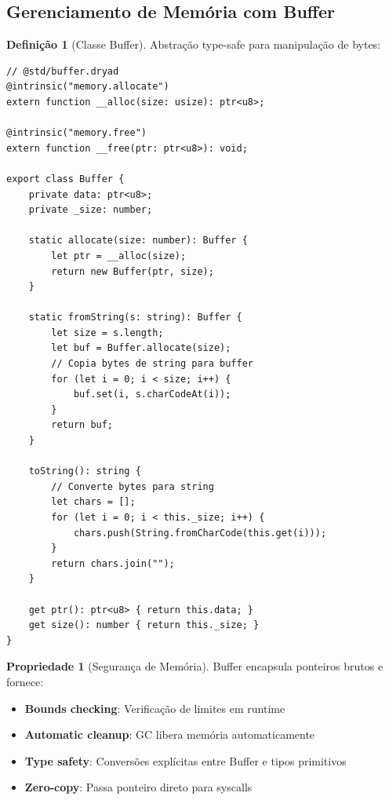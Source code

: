 \documentclass[12pt,a4paper]{article}
\theoremstyle{definition}
\newtheorem{definition}{Definição}[section]
\newtheorem{property}{Propriedade}[section]
\begin{document}
\subsection{Gerenciamento de Memória com Buffer}

\begin{definition}[Classe Buffer]
Abstração type-safe para manipulação de bytes:

\begin{verbatim}
// @std/buffer.dryad
@intrinsic("memory.allocate")
extern function __alloc(size: usize): ptr<u8>;

@intrinsic("memory.free")
extern function __free(ptr: ptr<u8>): void;

export class Buffer {
    private data: ptr<u8>;
    private _size: number;
    
    static allocate(size: number): Buffer {
        let ptr = __alloc(size);
        return new Buffer(ptr, size);
    }
    
    static fromString(s: string): Buffer {
        let size = s.length;
        let buf = Buffer.allocate(size);
        // Copia bytes de string para buffer
        for (let i = 0; i < size; i++) {
            buf.set(i, s.charCodeAt(i));
        }
        return buf;
    }
    
    toString(): string {
        // Converte bytes para string
        let chars = [];
        for (let i = 0; i < this._size; i++) {
            chars.push(String.fromCharCode(this.get(i)));
        }
        return chars.join("");
    }
    
    get ptr(): ptr<u8> { return this.data; }
    get size(): number { return this._size; }
}
\end{verbatim}
\end{definition}

\begin{property}[Segurança de Memória]
Buffer encapsula ponteiros brutos e fornece:
\begin{itemize}
    \item \textbf{Bounds checking}: Verificação de limites em runtime
    \item \textbf{Automatic cleanup}: GC libera memória automaticamente
    \item \textbf{Type safety}: Conversões explícitas entre Buffer e tipos primitivos
    \item \textbf{Zero-copy}: Passa ponteiro direto para syscalls
\end{itemize}
\end{property}
\end{document}
